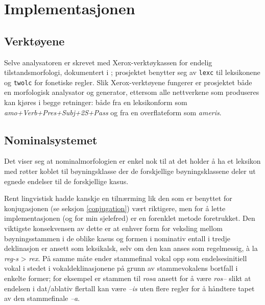 \documentclass{article}
\begin{document}
\section{Implementasjonen}
\subsection{Verkt\o{}yene}
Selve analysatoren er skrevet med Xerox-verkt\o{}ykassen for endelig
tilstandsmorfologi, dokumentert i ; prosjektet benytter seg av
\texttt{lexc} til leksikonene og \texttt{twolc} for fonetiske regler. Slik
Xerox-verkt\o{}yene fungerer er prosjektet b\aa{}de en morfologisk analysator
og generator, ettersom alle nettverkene som produseres kan kj\o{}res i begge
retninger: b\aa{}de fra en leksikonform som \emph{amo+Verb+Pres+Subj+2S+Pass}
og fra en overflateform som \emph{ameris}.


\subsection{Nominalsystemet}
Det viser seg at nominalmorfologien er enkel nok til at det holder \aa{} ha et
leksikon med r\o{}tter koblet til b\o{}yningsklasse der de forskjellige
b\o{}yningsklassene deler ut egnede endelser til de forskjellige kasus.

Rent lingvistisk hadde kanskje en tiln\ae{}rming lik den som er benyttet for
konjugasjonen (se seksjon \ref{conjugation}) v\ae{}rt riktigere, men for \aa{}
lette implementasjonen (og for min sjelefred) er en forenklet metode
foretrukket. Den viktigste konsekvensen av dette er at enhver form for
veksling mellom b\o{}yningsstammen i de oblike kasus og formen i nominativ
entall i tredje deklinasjon er ansett som leksikalsk, selv om den kan anses
som regelmessig, \`a la \emph{reg-s} > \emph{rex}. P\aa{} samme m\aa{}te ender
stammefinal vokal opp som endelsesinitiell vokal i stedet i
vokaldeklinasjonene p\aa{} grunn av stammevokalens bortfall i enkelte former;
for eksempel er stammen til \emph{rosa} ansett for \aa{} v\ae{}re \emph{ros--}
slikt at endelsen i dat/ablativ flertall kan v\ae{}re \emph{--is} uten flere
regler for \aa{} h\aa{}ndtere tapet av den stammefinale \emph{--a}.
\end{document}
